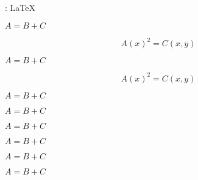 \documentclass[theme = dark]{../main/main}
\begin{document}
\tdoclatexin{\LaTeX} : \LaTeX


%
%
\begin{tdoclatex}
    $A = B + C$

    \begin{equation}
        A(x)^2 = C(x,y)
    \end{equation}
\end{tdoclatex}

\begin{tdoclatex}
    $A = B + C$

    \begin{equation}
        A(x)^2 = C(x,y)
    \end{equation}
\end{tdoclatex}

\vspace{12cm}

\begin{tdoclatex}
    $A = B + C$

    $A = B + C$

    $A = B + C$

    $A = B + C$

    $A = B + C$

    $A = B + C$
\end{tdoclatex}
\end{document}
